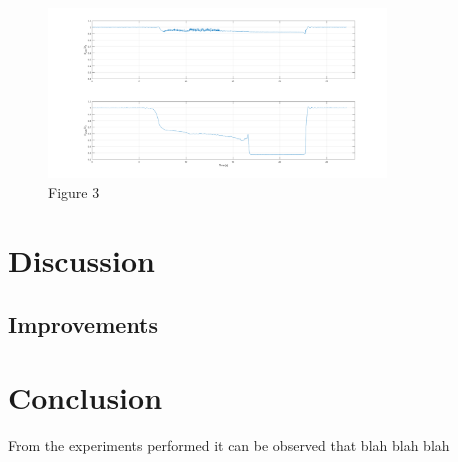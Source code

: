 \documentclass[8pt]{article}
\begin{document}
\newpage

\begin{figure}[H]
    \centering
    \includegraphics[width=0.8\textwidth]{tunnel_pressures.png}
    \caption{Figure 3}
    \label{fig:figure8}
\end{figure}

\newpage

\section{Discussion}


\subsection{Improvements}

\section{Conclusion}

From the experiments performed it can be observed that blah blah blah
\end{document}
